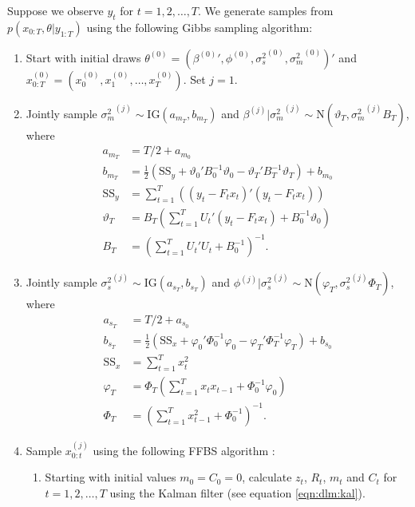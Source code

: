 Suppose we observe $y_t$ for $t = 1,2,\ldots,T$. We generate samples from $p(x_{0:T},\theta|y_{1:T})$ using the following Gibbs sampling algorithm:
\begin{enumerate}
\item Start with initial draws $\theta^{(0)} = ({\beta^{(0)}}', \phi^{(0)}, {\sigma^2_s}^{(0)}, {\sigma^2_m}^{(0)})'$ and \\ $x^{(0)}_{0:T} = (x^{(0)}_0, x^{(0)}_1, \ldots, x^{(0)}_T)$. Set $j = 1$.
\item \label{step:gibbs:dr:beta} Jointly sample ${\sigma^2_m}^{(j)} \sim \mbox{IG}(a_{m_T}, b_{m_T})$ and $\beta^{(j)}|{\sigma^2_m}^{(j)} \sim \mbox{N}(\vartheta_T,{\sigma^2_m}^{(j)}B_T)$, where
\begin{align}
a_{m_T} &= T/2 + a_{m_0} \label{eqn:dr:am} \\
b_{m_T} &= \frac{1}{2}(\mbox{SS}_y + \vartheta_0'B_0^{-1}\vartheta_0 - \vartheta_T'B_T^{-1}\vartheta_T) + b_{m_0} \label{eqn:dr:bm} \\
\mbox{SS}_y &= \sum^T_{t=1} \left((y_t - F_tx_t)'(y_t - F_tx_t)\right) \label{eqn:dr:ssy} \\
\vartheta_T &= B_T\left( \sum^T_{t=1} U_t'(y_t - F_tx_t) + B_0^{-1}\vartheta_0\right) \label{eqn:dr:b} \\
B_T &= \left(\sum^T_{t=1} U_t'U_t + B_0^{-1}\right)^{-1}. \label{eqn:dr:B}
\end{align}
\item \label{step:gibbs:dr:phi} Jointly sample ${\sigma^2_s}^{(j)} \sim \mbox{IG}(a_{s_T}, b_{s_T})$ and $\phi^{(j)}|{\sigma^2_s}^{(j)} \sim \mbox{N}(\varphi_T,{\sigma^2_s}^{(j)}\Phi_T)$, where
\begin{align}
a_{s_T} &= T/2 + a_{s_0} \label{eqn:dr:as} \\
b_{s_T} &= \frac{1}{2}(\mbox{SS}_x + \varphi_0'\Phi_0^{-1}\varphi_0 - \varphi_T'\Phi_T^{-1}\varphi_T) + b_{s_0} \label{eqn:dr:bs} \\
\mbox{SS}_x &= \sum^T_{t=1} x_t^2 \label{eqn:dr:ssx} \\
\varphi_T &= \Phi_T\left( \sum^T_{t=1} x_tx_{t-1} + \Phi_0^{-1}\varphi_0\right) \label{eqn:dr:phi} \\
\Phi_T &= \left(\sum^T_{t=1} x_{t-1}^2 + \Phi_0^{-1}\right)^{-1}. \label{eqn:dr:Phi}
\end{align}
\item \label{step:ffbs} Sample $x_{0:t}^{(j)}$ using the following FFBS algorithm \cite[Section 4.4][]{petris:camp:2009:dynamic}:
\begin{enumerate}
\item Starting with initial values $m_0 = C_0 = 0$, calculate $z_t$, $R_t$, $m_t$ and $C_t$ for $t = 1,2,\ldots,T$ using the Kalman filter (see equation \eqref{eqn:dlm:kal}).

\end{enumerate}
\end{enumerate}
